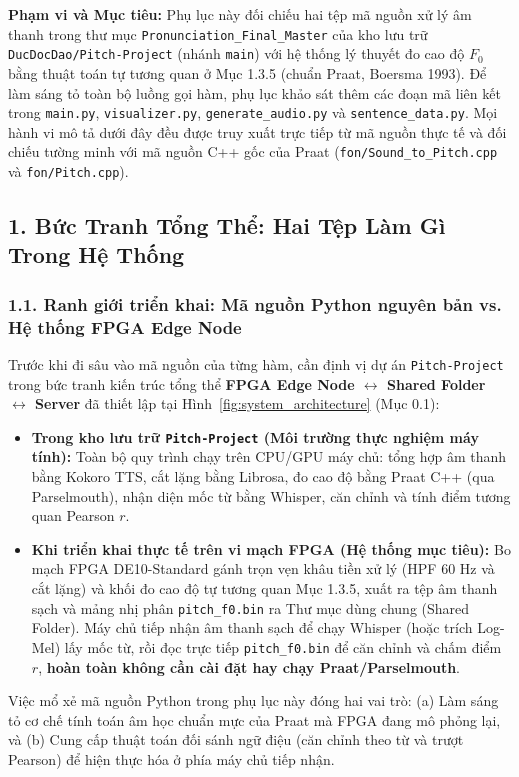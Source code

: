 \documentclass[11pt,a4paper]{article}
\begin{document}
\begin{learningobj}
\textbf{Phạm vi và Mục tiêu:} Phụ lục này đối chiếu hai tệp mã nguồn xử lý âm thanh trong thư mục \texttt{Pronunciation\_Final\_Master} của kho lưu trữ \texttt{DucDocDao/Pitch-Project} (nhánh \texttt{main}) với hệ thống lý thuyết đo cao độ $F_0$ bằng thuật toán tự tương quan ở Mục 1.3.5 (chuẩn Praat, Boersma 1993). Để làm sáng tỏ toàn bộ luồng gọi hàm, phụ lục khảo sát thêm các đoạn mã liên kết trong \texttt{main.py}, \texttt{visualizer.py}, \texttt{generate\_audio.py} và \texttt{sentence\_data.py}. Mọi hành vi mô tả dưới đây đều được truy xuất trực tiếp từ mã nguồn thực tế và đối chiếu tường minh với mã nguồn C++ gốc của Praat (\texttt{fon/Sound\_to\_Pitch.cpp} và \texttt{fon/Pitch.cpp}).
\end{learningobj}

\subsection*{1. Bức Tranh Tổng Thể: Hai Tệp Làm Gì Trong Hệ Thống}

\subsubsection*{1.1. Ranh giới triển khai: Mã nguồn Python nguyên bản vs. Hệ thống FPGA Edge Node}
Trước khi đi sâu vào mã nguồn của từng hàm, cần định vị dự án \texttt{Pitch-Project} trong bức tranh kiến trúc tổng thể \textbf{FPGA Edge Node $\leftrightarrow$ Shared Folder $\leftrightarrow$ Server} đã thiết lập tại Hình~\ref{fig:system_architecture} (Mục 0.1):
\begin{itemize}
    \setlength{\itemsep}{1pt}
    \item \textbf{Trong kho lưu trữ \texttt{Pitch-Project} (Môi trường thực nghiệm máy tính):} Toàn bộ quy trình chạy trên CPU/GPU máy chủ: tổng hợp âm thanh bằng Kokoro TTS, cắt lặng bằng Librosa, đo cao độ bằng Praat C++ (qua Parselmouth), nhận diện mốc từ bằng Whisper, căn chỉnh và tính điểm tương quan Pearson $r$.
    \item \textbf{Khi triển khai thực tế trên vi mạch FPGA (Hệ thống mục tiêu):} Bo mạch FPGA DE10-Standard gánh trọn vẹn khâu tiền xử lý (HPF 60 Hz và cắt lặng) và khối đo cao độ tự tương quan Mục 1.3.5, xuất ra tệp âm thanh sạch và mảng nhị phân \texttt{pitch\_f0.bin} ra Thư mục dùng chung (Shared Folder). Máy chủ tiếp nhận âm thanh sạch để chạy Whisper (hoặc trích Log-Mel) lấy mốc từ, rồi đọc trực tiếp \texttt{pitch\_f0.bin} để căn chỉnh và chấm điểm $r$, \textbf{hoàn toàn không cần cài đặt hay chạy Praat/Parselmouth}.
\end{itemize}
Việc mổ xẻ mã nguồn Python trong phụ lục này đóng hai vai trò: (a) Làm sáng tỏ cơ chế tính toán âm học chuẩn mực của Praat mà FPGA đang mô phỏng lại, và (b) Cung cấp thuật toán đối sánh ngữ điệu (căn chỉnh theo từ và trượt Pearson) để hiện thực hóa ở phía máy chủ tiếp nhận.
\end{document}
